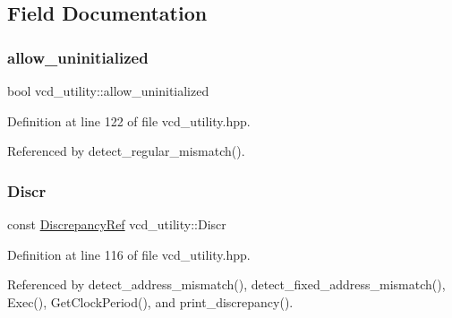 \subsection{Field Documentation}
\mbox{\label{classvcd__utility_a734d54c2216274c77124a96daad230ba}} 
\subsubsection{\texorpdfstring{allow\+\_\+uninitialized}{allow\_uninitialized}}
{\footnotesize\ttfamily bool vcd\+\_\+utility\+::allow\+\_\+uninitialized\hspace{0.3cm}{\ttfamily [protected]}}



Definition at line 122 of file vcd\+\_\+utility.\+hpp.



Referenced by detect\+\_\+regular\+\_\+mismatch().

\mbox{\label{classvcd__utility_a1fba2ae138894471f8fe8ea0efe604fe}} 
\subsubsection{\texorpdfstring{Discr}{Discr}}
{\footnotesize\ttfamily const \hyperlink{Discrepancy_8hpp_a9fb5a8938b4eeaafdaf7707f583f0193}{Discrepancy\+Ref} vcd\+\_\+utility\+::\+Discr\hspace{0.3cm}{\ttfamily [protected]}}



Definition at line 116 of file vcd\+\_\+utility.\+hpp.



Referenced by detect\+\_\+address\+\_\+mismatch(), detect\+\_\+fixed\+\_\+address\+\_\+mismatch(), Exec(), Get\+Clock\+Period(), and print\+\_\+discrepancy().

\mbox{\label{classvcd__utility_aba0984fc0ce2857599e312b5f273ad17}} 
